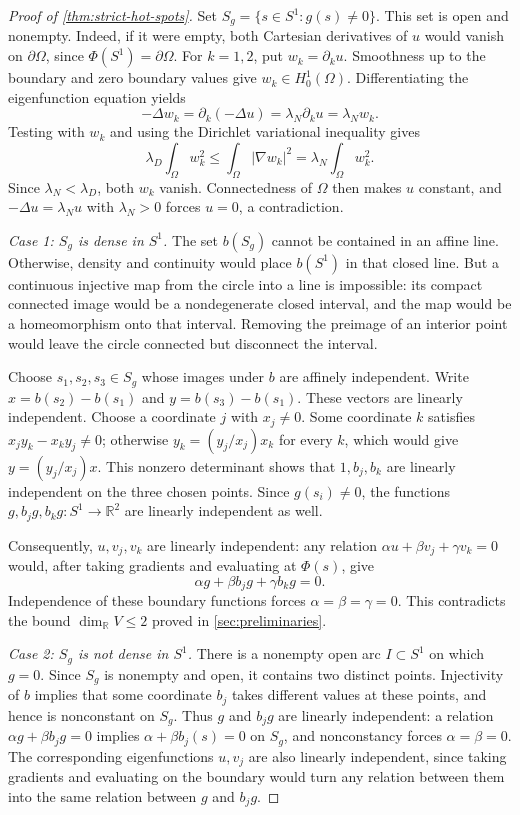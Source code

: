 \begin{proof}[Proof of \cref{thm:strict-hot-spots}]
Set $S_g=\{s\in S^1:g(s)\ne0\}$. This set is open and nonempty.
Indeed, if it were empty, both Cartesian derivatives of $u$ would
vanish on $\partial\Omega$, since $\Phi(S^1)=\partial\Omega$.
For $k=1,2$, put $w_k=\partial_k u$. Smoothness up to the boundary
and zero boundary values give $w_k\in H_0^1(\Omega)$. Differentiating
the eigenfunction equation yields
\[
 -\Delta w_k=\partial_k(-\Delta u)
 =\lambda_N\partial_k u=\lambda_Nw_k.
\]
Testing with $w_k$ and using the Dirichlet variational inequality gives
\[
 \lambda_D\int_\Omega w_k^2
 \le\int_\Omega|\nabla w_k|^2
 =\lambda_N\int_\Omega w_k^2.
\]
Since $\lambda_N<\lambda_D$, both $w_k$ vanish. Connectedness of
$\Omega$ then makes $u$ constant, and $-\Delta u=\lambda_Nu$ with
$\lambda_N>0$ forces $u=0$, a contradiction.

\medskip
\noindent\emph{Case 1: $S_g$ is dense in $S^1$.}
The set $b(S_g)$ cannot be contained in an affine line. Otherwise,
density and continuity would place $b(S^1)$ in that closed line.
But a continuous injective map from the circle into a line is
impossible: its compact connected image would be a nondegenerate
closed interval, and the map would be a homeomorphism onto that
interval. Removing the preimage of an interior point would leave
the circle connected but disconnect the interval.

Choose $s_1,s_2,s_3\in S_g$ whose images under $b$ are affinely
independent. Write $x=b(s_2)-b(s_1)$ and $y=b(s_3)-b(s_1)$.
These vectors are linearly independent. Choose a coordinate $j$
with $x_j\ne0$. Some coordinate $k$ satisfies
$x_jy_k-x_ky_j\ne0$; otherwise $y_k=(y_j/x_j)x_k$ for every $k$,
which would give $y=(y_j/x_j)x$. This nonzero determinant shows
that $1,b_j,b_k$ are linearly independent on the three chosen points.
Since $g(s_i)\ne0$, the functions $g,b_jg,b_kg:S^1\to\mathbb R^2$
are linearly independent as well.

Consequently, $u,v_j,v_k$ are linearly independent: any relation
$\alpha u+\beta v_j+\gamma v_k=0$ would, after taking gradients
and evaluating at $\Phi(s)$, give
\[
 \alpha g+\beta b_jg+\gamma b_kg=0.
\]
Independence of these boundary functions forces
$\alpha=\beta=\gamma=0$. This contradicts the bound
$\dim_{\mathbb R}V\le2$ proved in \cref{sec:preliminaries}.

\medskip
\noindent\emph{Case 2: $S_g$ is not dense in $S^1$.}
There is a nonempty open arc $I\subset S^1$ on which $g=0$.
Since $S_g$ is nonempty and open, it contains two distinct points.
Injectivity of $b$ implies that some coordinate $b_j$ takes different
values at these points, and hence is nonconstant on $S_g$.
Thus $g$ and $b_jg$ are linearly independent: a relation
$\alpha g+\beta b_jg=0$ implies $\alpha+\beta b_j(s)=0$ on $S_g$,
and nonconstancy forces $\alpha=\beta=0$. The corresponding
eigenfunctions $u,v_j$ are also linearly independent, since taking
gradients and evaluating on the boundary would turn any relation
between them into the same relation between $g$ and $b_jg$.


\end{proof}
